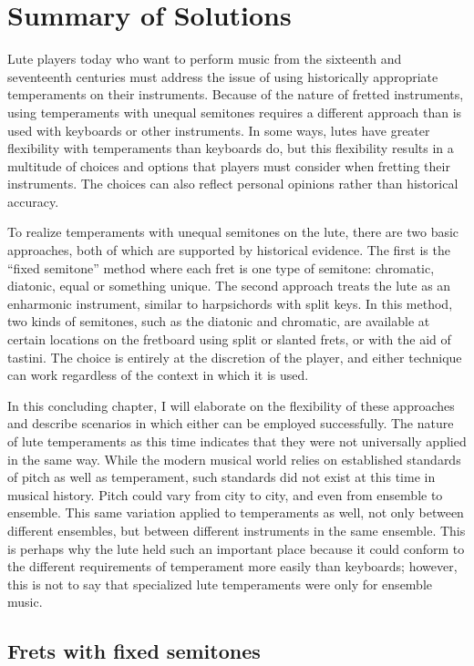 \chapter{Summary of Solutions}

Lute players today who want to perform music from the sixteenth and seventeenth
centuries must address the issue of using historically appropriate temperaments on
their instruments. Because of the nature of fretted instruments, using temperaments
with unequal semitones requires a different approach than is used with keyboards or
other instruments. In some ways, lutes have greater flexibility with temperaments than
keyboards do, but this flexibility results in a multitude of choices and options that
players must consider when fretting their instruments. The choices can also reflect
personal opinions rather than historical accuracy.

To realize temperaments with unequal semitones on the lute, there are two basic
approaches, both of which are supported by historical evidence. The first is the
``fixed semitone'' method where each fret is one type of semitone: chromatic, diatonic,
equal or something unique. The second approach treats the lute as an enharmonic
instrument, similar to harpsichords with split keys. In this method, two kinds of
semitones, such as the diatonic and chromatic, are available at
certain locations on the fretboard using split or slanted frets, or with the aid of
tastini. The choice is entirely at the discretion of the player, and either
technique can work regardless of the context in which it is used.

In this concluding chapter, I will elaborate on the flexibility of these approaches and
describe scenarios in which either can be employed successfully. The nature of lute
temperaments as this time indicates that they were not universally applied in the same
way. While the modern musical world relies on established standards of pitch as well
as temperament, such standards did not exist at this time in musical history. Pitch
could vary from city to city, and even from ensemble to ensemble. This same variation
applied to temperaments as well, not only between different ensembles, but between
different instruments in the same ensemble. This is perhaps why the lute held such an
important place because it could conform to the different requirements of temperament
more easily than keyboards; however, this is not to say that specialized lute
temperaments were only for ensemble music.

\section{Frets with fixed semitones}

